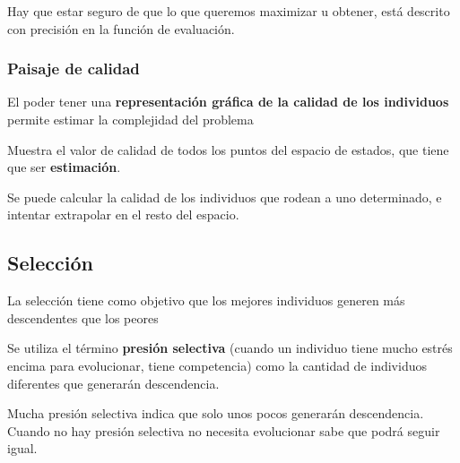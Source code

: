 \documentclass[12pt, twoside, openright]{report} %
\begin{document}
Hay que estar seguro de que lo que queremos maximizar u obtener, está descrito con precisión en la función de evaluación.
\subsubsection{Paisaje de calidad}
El poder tener una \textbf{representación gráfica de la calidad de los individuos} permite estimar la complejidad del problema

Muestra el valor de calidad de todos los puntos del espacio de estados, que tiene que ser \textbf{estimación}.

Se puede calcular la calidad de los individuos que rodean a uno determinado, e intentar extrapolar en el resto del espacio.

\subsection{Selección}
La selección tiene como objetivo que los mejores individuos generen más descendentes que los peores

Se utiliza el término \textbf{presión selectiva} (cuando un individuo tiene mucho estrés encima para evolucionar, tiene competencia) como la cantidad de individuos diferentes que generarán descendencia.

Mucha presión selectiva indica que solo unos pocos generarán descendencia. Cuando no hay presión selectiva no necesita evolucionar sabe que podrá seguir igual.
\pagebreak
\end{document}
